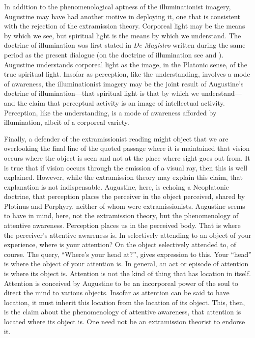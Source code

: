 \documentclass[12pt]{article}
\begin{document}

In addition to the phenomenological aptness of the illuminationist imagery, Augustine may have had another motive in deploying it, one that is consistent with the rejection of the extramission theory. Corporeal light may be the means by which we see, but spiritual light is the means by which we understand. The doctrine of illumination was first stated in \emph{De Magistro} written during the same period as the present dialogue (on the doctrine of illumination see \citealt{Allers:1952os} and \citealt{Matthews:2014aa}). Augustine understands corporeal light as the image, in the Platonic sense, of the true spiritual light.  Insofar as perception, like the understanding, involves a mode of awareness, the illuminationist imagery may be the joint result of Augustine's doctrine of illumination---that spiritual light is that by which we understand---and the claim that perceptual activity is an image of intellectual activity. Perception, like the understanding, is a mode of awareness afforded by illumination, albeit of a corporeal variety.

Finally, a defender of the extramissionist reading might object that we are overlooking the final line of the quoted passage where it is maintained that vision occurs where the object is seen and not at the place where sight goes out from. It is true that if vision occurs through the emission of a visual ray, then this is well explained. However, while the extramission theory may explain this claim, that explanation is not indispensable. Augustine, here, is echoing a Neoplatonic doctrine, that perception places the perceiver in the object perceived, shared by Plotinus and Porphyry, neither of whom were extramissionists. Augustine seems to have in mind, here, not the extramission theory, but the phenomenology of attentive awareness. Perception places us in the perceived body. That is where the perceiver’s attentive awareness is. In selectively attending to an object of your experience, where is your attention? On the object selectively attended to, of course. The query, ``Where’s your head at?'', gives expression to this. Your ``head'' is where the object of your attention is. In general, an act or episode of attention is where its object is. Attention is not the kind of thing that has location in itself. Attention is conceived by Augustine to be an incorporeal power of the soul to direct the mind to various objects. Insofar as attention can be said to have location, it must inherit this location from the location of its object. This, then, is the claim about the phenomenology of attentive awareness, that attention is located where its object is. One need not be an extramission theorist to endorse it.
\end{document}
